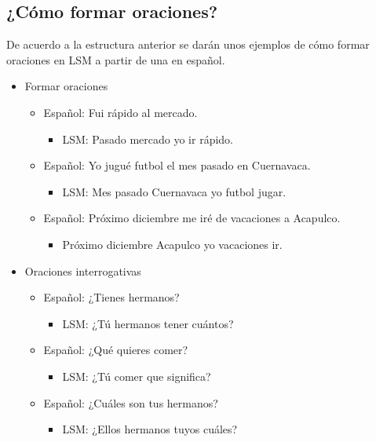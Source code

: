 \subsection{¿Cómo formar oraciones?}

De acuerdo a la estructura anterior se darán unos ejemplos de cómo formar oraciones en LSM a partir de una en español.

\begin{itemize}

\item	Formar oraciones

\begin{itemize}
\item	Español: Fui rápido al mercado.
\begin{itemize}
\item	LSM: Pasado mercado yo ir rápido.
\end{itemize}
\item	Español: Yo jugué futbol el mes pasado en Cuernavaca.
\begin{itemize}
\item	LSM: Mes pasado Cuernavaca yo futbol jugar.
\end{itemize}
\item	Español: Próximo diciembre me iré de vacaciones a Acapulco.
\begin{itemize}
\item	Próximo diciembre Acapulco yo vacaciones ir.
\end{itemize}
\end{itemize}

\item	Oraciones interrogativas

\begin{itemize}
\item	Español: ¿Tienes hermanos?
\begin{itemize}
\item	LSM: ¿Tú hermanos tener cuántos?
\end{itemize}
\item	Español: ¿Qué quieres comer?
\begin{itemize}
\item	LSM: ¿Tú comer que significa?
\end{itemize}
\item	Español: ¿Cuáles son tus hermanos?
\begin{itemize}
\item	LSM: ¿Ellos hermanos tuyos cuáles?
\end{itemize}
\end{itemize}


\end{itemize}
